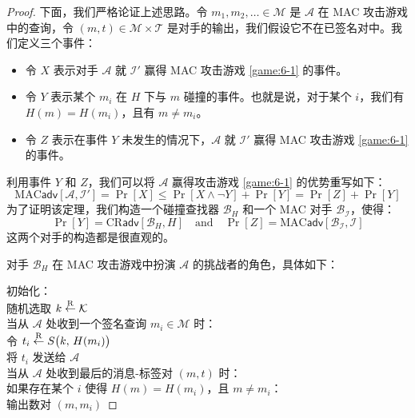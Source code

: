\begin{proof}
下面，我们严格论证上述思路。令 $m_1,m_2,\dots\in\mathcal{M}$ 是 $\mathcal{A}$ 在 MAC 攻击游戏中的查询，令 $(m,t)\in\mathcal{M}\times\mathcal{T}$ 是对手的输出，我们假设它不在已签名对中。我们定义三个事件：
\begin{itemize}
	\item 令 $X$ 表示对手 $\mathcal{A}$ 就 $\mathcal{I}'$ 赢得 MAC 攻击游戏 \ref{game:6-1} 的事件。
	\item 令 $Y$ 表示某个 $m_i$ 在 $H$ 下与 $m$ 碰撞的事件。也就是说，对于某个 $i$，我们有 $H(m)=H(m_i)$，且有 $m\neq m_i$。
	\item 令 $Z$ 表示在事件 $Y$ 未发生的情况下，$\mathcal{A}$ 就 $\mathcal{I}'$ 赢得 MAC 攻击游戏 \ref{game:6-1} 的事件。
\end{itemize}
利用事件 $Y$ 和 $Z$，我们可以将 $\mathcal{A}$ 赢得攻击游戏 \ref{game:6-1} 的优势重写如下：
\begin{equation}\label{eq:8-2}
\mathrm{MAC}\mathsf{adv}[\mathcal{A},\mathcal{I}']
=\Pr[X]
\leq\Pr[X\land\lnot Y]+\Pr[Y]
=\Pr[Z]+\Pr[Y]
\end{equation}
为了证明该定理，我们构造一个碰撞查找器 $\mathcal{B}_H$ 和一个 MAC 对手 $\mathcal{B}_\mathcal{I}$，使得：
\[
\Pr[Y]=\mathrm{CR}\mathsf{adv}[\mathcal{B}_H,H]
\quad\text{and}\quad
\Pr[Z]=\mathrm{MAC}\mathsf{adv}[\mathcal{B}_\mathcal{I},\mathcal{I}]
\]
这两个对手的构造都是很直观的。

对手 $\mathcal{B}_H$ 在 MAC 攻击游戏中扮演 $\mathcal{A}$ 的挑战者的角色，具体如下：

\vspace{5pt}

\hspace*{5pt} 初始化：\\
\hspace*{50pt} 随机选取 $k\overset{\rm R}\leftarrow\mathcal{K}$\\
\hspace*{26pt} 当从 $\mathcal{A}$ 处收到一个签名查询 $m_i\in\mathcal{M}$ 时：\\
\hspace*{50pt} 令 $t_i\overset{\rm R}\leftarrow S\big(k,\,H(m_i)\big)$\\
\hspace*{50pt} 将 $t_i$ 发送给 $\mathcal{A}$\\
\hspace*{26pt} 当从 $\mathcal{A}$ 处收到最后的消息-标签对 $(m,t)$ 时：\\
\hspace*{50pt} 如果存在某个 $i$ 使得 $H(m)=H(m_i)$，且 $m\neq m_i$：\\
\hspace*{75pt} 输出数对 $(m,m_i)$


\end{proof}
